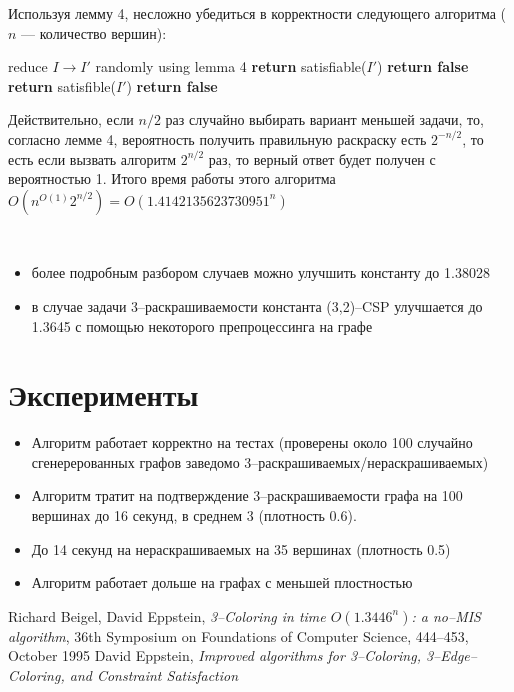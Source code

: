 \documentclass[fleqn]{article}
\theoremstyle{plain}
\theoremstyle{plain}
\theoremstyle{plain}
\theoremstyle{definition}
\begin{document}
Используя лемму 4, несложно убедиться в корректности следующего алгоритма ($n$ --- количество вершин):
\begin{algorithm}[H]
  \begin{algorithmic}[1]
				\State reduce $I \rightarrow I'$ randomly using lemma 4
				\State \textbf{return} satisfiable($I'$)
				\State \textbf{return false}
			\Else
				\State \textbf{return} satisfible($I'$)
			\EndIf
    	\EndFor
    	\State \textbf{return false}
    \EndFunction
  \end{algorithmic}
\end{algorithm}

Действительно, если $n/2$ раз случайно выбирать вариант меньшей задачи, то, согласно лемме 4, вероятность получить правильную раскраску есть $2^{-n/2}$, то есть если вызвать алгоритм $2^{n/2}$ раз, то верный ответ будет получен с вероятностью 1. Итого время работы этого алгоритма $O(n^{O(1)}2^{n/2}) = O(1.4142135623730951^n)$


\

\begin{itemize}
	\item более подробным разбором случаев можно улучшить константу до 1.38028
	\item в случае задачи 3--раскрашиваемости константа (3,2)--CSP улучшается до 1.3645 с помощью некоторого препроцессинга на графе
\end{itemize} 

\section{Эксперименты}
\begin{itemize}
	\item Алгоритм работает корректно на тестах (проверены около 100 случайно сгенерерованных графов заведомо 3--раскрашиваемых/нераскрашиваемых)
	\item Алгоритм тратит на подтверждение 3--раскрашиваемости графа на 100 вершинах до 16 секунд, в среднем 3 (плотность 0.6).
	\item До 14 секунд на нераскрашиваемых на 35 вершинах (плотность 0.5)
	\item Алгоритм работает дольше на графах с меньшей плостностью
\end{itemize}
\begin{thebibliography}{}
     Richard Beigel, David Eppstein, \emph{3--Coloring in time $O(1.3446^n)$: a no--MIS algorithm}, 36th Symposium on Foundations of Computer Science, 444--453, October 1995
     David Eppstein, \emph{Improved algorithms for 3--Coloring, 3--Edge--Coloring, and Constraint Satisfaction} 
\end{thebibliography}
\end{document}
